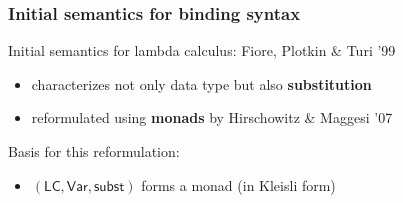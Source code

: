\documentclass[
]
{beamer}
\newcommand{\constfont}[1]{\ensuremath{\mathsf{#1}}}
\newcommand{\subst}{\constfont{subst}}
\newcommand{\Var}{\constfont{Var}}
\newcommand{\LC}{\mathsf{LC}}
\newcommand{\fat}[1]{\textbf{#1}}
\begin{document}
\begin{frame}
 \frametitle{Initial semantics for binding syntax}
    
    \begin{block}{Initial semantics for lambda calculus: Fiore, Plotkin \& Turi '99}
      \begin{itemize}
       \item characterizes not only data type but also \fat{substitution} %
       \item reformulated using \fat{monads} by Hirschowitz \& Maggesi '07
      \end{itemize}
    \end{block}

  Basis for this reformulation:
    
    \begin{lemma}
       \begin{itemize}
         \item [] $(\LC, \Var, \subst)$ forms a monad (in Kleisli form)
       \end{itemize}

    \end{lemma}

    
%     

\end{frame}
\end{document}
